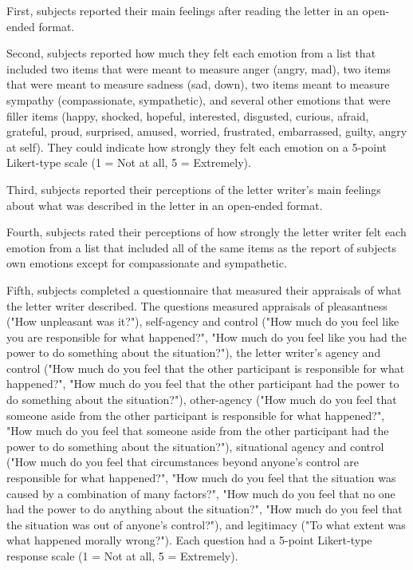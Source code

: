 \documentclass[man,a4paper,noextraspace,apacite]{apa6}
\begin{document}
First, subjects reported their main feelings after reading the letter in an open-ended format.

Second, subjects reported how much they felt each emotion from a list that included two items that were meant to measure anger (angry, mad), two items that were meant to measure sadness (sad, down), two items meant to measure sympathy (compassionate, sympathetic), and several other emotions that were filler items (happy, shocked, hopeful, interested, disgusted, curious, afraid, grateful, proud, surprised, amused, worried, frustrated, embarrassed, guilty, angry at self). They could indicate how strongly they felt each emotion on a 5-point Likert-type scale (1 = Not at all, 5 = Extremely).

Third, subjects reported their perceptions of the letter writer's main feelings about what was described in the letter in an open-ended format.

Fourth, subjects rated their perceptions of how strongly the letter writer felt each emotion from a list that included all of the same items as the report of subjects own emotions except for compassionate and sympathetic.

Fifth, subjects completed a questionnaire that measured their appraisals of what the letter writer described. The questions measured appraisals of pleasantness ("How unpleasant was it?"), self-agency and control ("How much do you feel like you are responsible for what happened?", "How much do you feel like you had the power to do something about the situation?"), the letter writer's agency and control ("How much do you feel that the other participant is responsible for what happened?", "How much do you feel that the other participant had the power to do something about the situation?"), other-agency ("How much do you feel that someone aside from the other participant is responsible for what happened?", "How much do you feel that someone aside from the other participant had the power to do something about the situation?"), situational agency and control ("How much do you feel that circumstances beyond anyone's control are responsible for what happened?", "How much do you feel that the situation was caused by a combination of many factors?", "How much do you feel that no one had the power to do anything about the situation?", "How much do you feel that the situation was out of anyone's control?"), and legitimacy ("To what extent was what happened morally wrong?"). Each question had a 5-point Likert-type response scale (1 = Not at all, 5 = Extremely).
\end{document}
